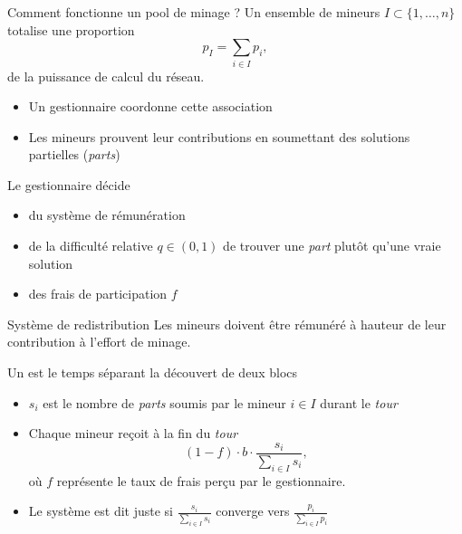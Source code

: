 \documentclass{beamer}
\begin{document}
\begin{frame}{Comment fonctionne un pool de minage ?}
\scriptsize
Un ensemble de mineurs $I\subset\{1,\ldots, n\}$ totalise une proportion 
$$
p_I = \sum_{i\in I }p_i,
$$
de la puissance de calcul du réseau. 
\begin{itemize}
  \item Un gestionnaire coordonne cette association
  \item Les mineurs prouvent leur contributions en soumettant des solutions partielles (\textit{parts})  
\end{itemize}
Le gestionnaire décide
\begin{itemize} 
  \item du système de rémunération
  \item de la difficulté relative $q\in(0,1)$ de trouver une \textit{part} plutôt qu'une vraie solution
  \item des frais de participation $f$
  \end{itemize} 
\end{frame}
\begin{frame}{Système de redistribution}
\scriptsize
Les mineurs doivent être rémunéré à hauteur de leur contribution à l'effort de minage. 
\begin{tcolorbox}[enhanced,drop shadow, title=Proportional reward system]
Un  est le temps séparant la découvert de deux blocs 
\begin{itemize} 
  \item $s_i$ est le nombre de \textit{parts} soumis par le mineur $i\in I$ durant le \textit{tour}
  \item Chaque mineur reçoit à la fin du \textit{tour}
  $$
  (1-f)\cdot b\cdot\frac{s_i}{\sum_{i\in I}s_i},
  $$
  où $f$ représente le taux de frais perçu par le gestionnaire.
  \item Le système est dit juste si $\frac{s_i}{\sum_{i\in I}s_i}$ converge vers $\frac{p_i}{\sum_{i\in I}p_i}$
\end{itemize}

\end{tcolorbox}
\end{frame}
\end{document}
